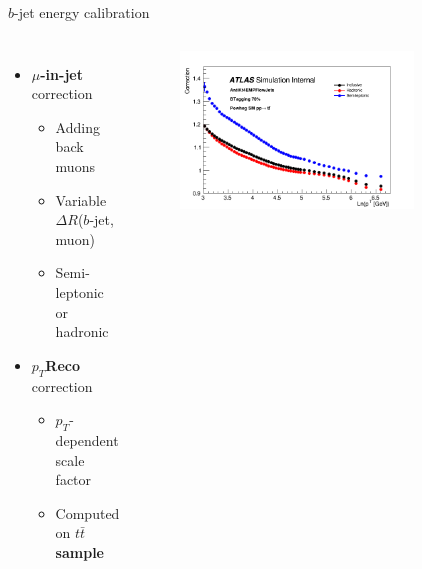 \begin{frame}{$b$-jet energy calibration}
\begin{columns}
\begin{itemize}
    \item \textcolor{HHred}{\textbf{$\mu$-in-jet} correction}
    \begin{itemize}
        \item Adding back muons
        \item Variable $\Delta R$($b$-jet, muon) 
        \item Semi-leptonic or hadronic
    \end{itemize}
    \item \textcolor{HHturquoise_d}{\textbf{$p_T$Reco} correction}
    \begin{itemize}
        \item $p_T$-dependent scale factor
        \item Computed on \textbf{$t\bar{t}$ sample}
    \end{itemize}
\end{itemize}
\begin{figure}
    \centering
    \includegraphics[width=0.8\textwidth]{Part3/Img/ptrecopflow.png}
\end{figure}


\end{columns}
\end{frame}
